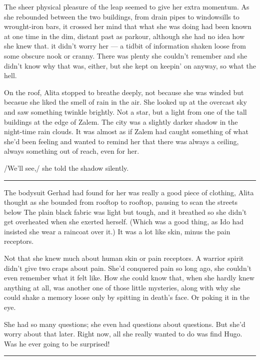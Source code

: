 \documentclass[11pt]{article}
\begin{document}
The sheer physical pleasure of the leap seemed to give her extra momentum. As she rebounded between the two buildings, from drain pipes to windowsills to wrought-iron bars, it crossed her mind that what she was doing had been known at one time in the dim, distant past as parkour, although she had no idea how she knew that. it didn't worry her --- a tidbit of information shaken loose from some obscure nook or cranny. There was plenty she couldn't remember and she didn't know why that was, either, but she kept on keepin' on anyway, so what the hell.

On the roof, Alita stopped to breathe deeply, not because she was winded but becasue she liked the smell of rain in the air. She looked up at the overcast sky and saw something twinkle brightly. Not a star, but a light from one of the tall buildings at the edge of Zalem. The city was a slightly darker shadow in the night-time rain clouds. It was almost as if Zalem had caught something of what she'd been feeling and wanted to remind her that there was always a ceiling, always something out of reach, even for her.

/We'll see,/ she told the shadow silently.




\rule{\linewidth}{0.5pt}




The bodysuit Gerhad had found for her was really a good piece of clothing, Alita thought as she bounded from rooftop to rooftop, pausing to scan the streets below The plain black fabric was light but tough, and it breathed so she didn't get overheated when she exerted herself. (Which was a good thing, as Ido had insisted she wear a raincoat over it.) It was a lot like skin, minus the pain receptors.

Not that she knew much about human skin or pain receptors. A warrior spirit didn't give two craps about pain. She'd conquered pain so long ago, she couldn't even remember what it felt like. How she could know that, when she hardly knew anything at all, was another one of those little mysteries, along with why she could shake a memory loose only by spitting in death's face. Or poking it in the eye.

She had so many questions; she even had questions about questions. But she'd worry about that later. Right now, all she really wanted to do was find Hugo. Was he ever going to be surprised!




\rule{\linewidth}{0.5pt}
\end{document}
